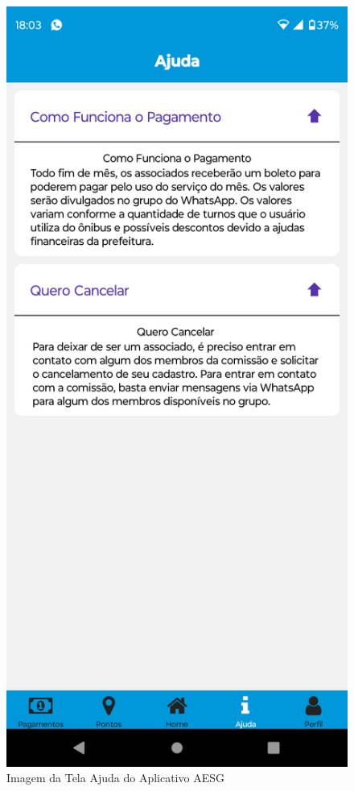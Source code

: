 \documentclass[
    12pt,                   %
    openright,              %
    oneside,                %
    a4paper,                %
    sumario=tradicional,    %
    english,                %
    brazil,                 %
    ]{abntex2}
\begin{document}
\begin{figure}[!h]
\begin{minipage}{0.5\textwidth}
                \end{minipage}%
                \begin{minipage}{0.5\textwidth}
                    \centering
                    \includegraphics[width=0.8\linewidth]{Imagens/App Images User/AUAjuda2.png}
                    \caption[Imagem da Tela Ajuda do Aplicativo AESG]{ 
                    Imagem da Tela Ajuda do Aplicativo AESG}
                    \label{fig:AppTelaAjuda2}
                \end{minipage}
            \end{figure}
\end{document}

